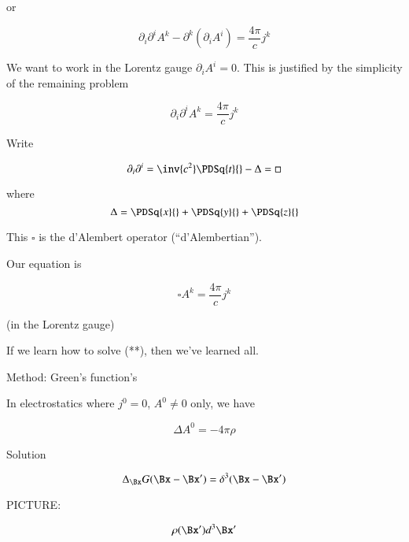 or

\begin{equation}\label{eqn:relativisticElectrodynamicsL17:250}
\partial_i \partial^i A^k - \partial^k (\partial_i A^i) = \frac{ 4 \pi}{c} j^k
\end{equation}

We want to work in the Lorentz gauge $\partial_i A^i = 0$.  This is justified by the simplicity of the remaining problem

\begin{equation}\label{eqn:relativisticElectrodynamicsL17:270}
\partial_i \partial^i A^k = \frac{4 \pi}{c} j^k
\end{equation}

Write

\begin{equation}\label{eqn:relativisticElectrodynamicsL17:290}
\partial_i \partial^i = \inv{c^2} \PDSq{t}{} - \Delta = \square
\end{equation}

where
\begin{equation}\label{eqn:relativisticElectrodynamicsL17:291}
\Delta = \PDSq{x}{} + \PDSq{y}{} + \PDSq{z}{}
\end{equation}

This $\square$ is the d'Alembert operator (``d'Alembertian'').

Our equation is 

\begin{equation}\label{eqn:relativisticElectrodynamicsL17:310}
\square A^k = \frac{4 \pi}{c} j^k
\end{equation}

(in the Lorentz gauge)

If we learn how to solve (**), then we've learned all.

Method: Green's function's

In electrostatics where $j^0 = 0$, $A^0 \ne 0$ only, we have

\begin{equation}\label{eqn:relativisticElectrodynamicsL17:330}
\Delta A^0 = -4 \pi \rho
\end{equation}

Solution 

\begin{equation}\label{eqn:relativisticElectrodynamicsL17:350}
\Delta_{\Bx} G(\Bx - \Bx') = \delta^3( \Bx - \Bx')
\end{equation}

PICTURE: 

\begin{equation}\label{eqn:relativisticElectrodynamicsL17:370}
\rho(\Bx') d^3 \Bx'
\end{equation}

